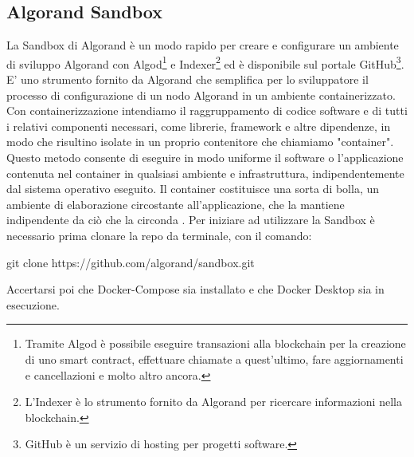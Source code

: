\subsection{Algorand Sandbox}
La Sandbox di Algorand è un modo rapido per creare e configurare un ambiente di sviluppo Algorand con Algod\footnote{Tramite Algod è possibile eseguire transazioni alla blockchain per la creazione di uno smart contract, effettuare chiamate a quest’ultimo, fare aggiornamenti e cancellazioni e molto altro ancora.} e Indexer\footnote{L'Indexer è lo strumento fornito da Algorand per ricercare informazioni nella blockchain.} ed è disponibile sul portale GitHub\footnote{GitHub è un servizio di hosting per progetti software.}. E' uno strumento fornito da Algorand che semplifica per lo sviluppatore il processo di configurazione di un nodo Algorand in un ambiente containerizzato. Con containerizzazione intendiamo il raggruppamento di codice software e di tutti i relativi componenti necessari, come librerie, framework e altre dipendenze, in modo che risultino isolate in un proprio contenitore che chiamiamo "container". Questo metodo consente di eseguire in modo uniforme il software o l'applicazione contenuta nel container in qualsiasi ambiente e infrastruttura, indipendentemente dal sistema operativo eseguito. Il container costituisce una sorta di bolla, un ambiente di elaborazione circostante all'applicazione, che la mantiene indipendente da ciò che la circonda \cite{containerization}. Per iniziare ad utilizzare la Sandbox è necessario prima clonare la repo da terminale, con il comando:
\begin{pythoncode}
git clone https://github.com/algorand/sandbox.git
\end{pythoncode}
Accertarsi poi che Docker-Compose sia installato e che Docker Desktop sia in esecuzione.

